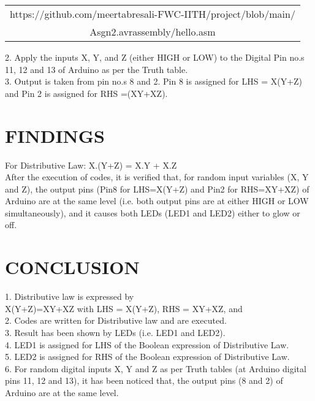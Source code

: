 \documentclass[conference]{IEEEtran}
\begin{document}
\begin{table}[h]
\centering
\begin{tabular}{| c |} \hline
 \rule{0pt}{20pt} https://github.com/meertabresali-FWC-IITH/project/blob/main/ \\
 Asgn2.avrassembly/hello.asm\\
  \hline
\end{tabular}
\end{table}
\begin{flushleft}
2. Apply the inputs X, Y, and Z (either HIGH or LOW) to the Digital Pin no.s 11, 12 and 13 of Arduino as per the Truth table.\\
\vspace{0.4cm}
3. Output is taken from pin no.s 8 and 2. Pin 8 is assigned for LHS = X(Y+Z) and Pin 2 is assigned for RHS =(XY+XZ). 
\end{flushleft}

\section{FINDINGS}
\begin{flushleft}
For Distributive Law: X.(Y+Z) = X.Y + X.Z \\
\vspace{0.3cm}
After the execution of codes, it is verified that, for random input variables (X, Y and Z), the output pins (Pin8 for LHS=X(Y+Z) and Pin2 for RHS=XY+XZ) of Arduino are at the same level (i.e. both output pins are at either HIGH or LOW simultaneously), and it causes both LEDs (LED1 and LED2) either to glow or off.\\

\end{flushleft}
\section{CONCLUSION}
\begin{flushleft}
1. Distributive law is expressed by \\
X(Y+Z)=XY+XZ with LHS = X(Y+Z), RHS = XY+XZ, and \\
2. Codes are written for Distributive law and are executed.\\
3. Result has been shown by LEDs (i.e. LED1 and LED2). \\
4. LED1 is assigned for LHS of the Boolean expression of Distributive Law. \\
5. LED2 is assigned for RHS of the Boolean expression of Distributive Law. \\
6. For random digital inputs X, Y and Z as per Truth tables (at Arduino digital pins 11, 12 and 13), it has been noticed that, the output pins (8 and 2) of Arduino are at the same level.
\end{flushleft}
\end{document}
